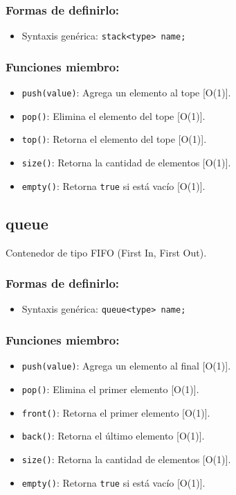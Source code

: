 \subsubsection{Formas de definirlo:}
\begin{itemize}
  \item Syntaxis genérica: \texttt{stack<type> name;}
\end{itemize}

\subsubsection{Funciones miembro:}
\begin{itemize}
  \item \texttt{push(value)}: Agrega un elemento al tope [O(1)].
  \item \texttt{pop()}: Elimina el elemento del tope [O(1)].
  \item \texttt{top()}: Retorna el elemento del tope [O(1)].
  \item \texttt{size()}: Retorna la cantidad de elementos [O(1)].
  \item \texttt{empty()}: Retorna \texttt{true} si está vacío [O(1)]. 
\end{itemize}

\subsection{queue}
\label{subsec:std_queue}
Contenedor de tipo FIFO (First In, First Out). 

\subsubsection{Formas de definirlo:}
\begin{itemize}
  \item Syntaxis genérica: \texttt{queue<type> name;}
\end{itemize}

\subsubsection{Funciones miembro:}
\begin{itemize}
  \item \texttt{push(value)}: Agrega un elemento al final [O(1)].
  \item \texttt{pop()}: Elimina el primer elemento [O(1)].
  \item \texttt{front()}: Retorna el primer elemento [O(1)].
  \item \texttt{back()}: Retorna el último elemento [O(1)].
  \item \texttt{size()}: Retorna la cantidad de elementos [O(1)].
  \item \texttt{empty()}: Retorna \texttt{true} si está vacío [O(1)]. 
\end{itemize}

